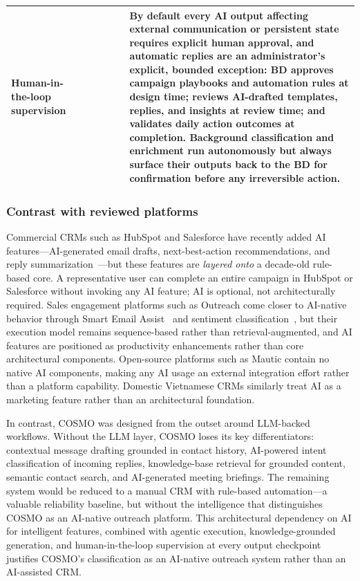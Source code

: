 \documentclass[a4paper]{article}
\newcommand{\fullcimark}{\CIRCLE}
\newcommand{\halfcimark}{\LEFTcircle}
\newcommand{\nocimark}{\Circle}
\begin{document}
\begin{table}[H]
{\begin{tabular}{l c c c c c p{6.5cm}}
\addlinespace
\addlinespace
Human-in-the-loop supervision
& \fullcimark & \halfcimark & \halfcimark & \fullcimark & \nocimark
& By default every AI output affecting external communication or
persistent state requires explicit human approval, and automatic
replies are an administrator's explicit, bounded exception: BD approves campaign
playbooks and automation rules at design time; reviews AI-drafted
templates, replies, and insights at review time; and validates
daily action outcomes at completion. Background classification
and enrichment run autonomously but always surface their outputs
back to the BD for confirmation before any irreversible action. \\

\bottomrule
\end{tabular}}
\end{table}

\subsubsection{Contrast with reviewed platforms} 
Commercial CRMs such as HubSpot and Salesforce have recently added 
AI features---AI-generated email drafts, next-best-action 
recommendations, and reply 
summarization~\cite{hubspot_ai_email_creation, 
salesforce_einstein_gpt_sales_emails, ms_d365_copilot_overview}---but 
these features are \emph{layered onto} a decade-old rule-based 
core. A representative user can complete an entire campaign in 
HubSpot or Salesforce without invoking any AI feature; AI is 
optional, not architecturally required. Sales engagement platforms 
such as Outreach come closer to AI-native behavior through Smart 
Email Assist~\cite{outreach_ai_content_reporting} and sentiment 
classification~\cite{outreach_sentiment_classification}, but their 
execution model remains sequence-based rather than 
retrieval-augmented, and AI features are positioned as productivity 
enhancements rather than core architectural components. Open-source 
platforms such as Mautic contain no native AI components, 
making any AI usage an external integration effort rather than a 
platform capability. Domestic Vietnamese CRMs similarly treat AI 
as a marketing feature rather than an architectural foundation.

In contrast, COSMO was designed from the outset around LLM-backed 
workflows. Without the LLM layer, COSMO loses its key 
differentiators: contextual message drafting grounded in contact 
history, AI-powered intent classification of incoming replies, 
knowledge-base retrieval for grounded content, semantic contact 
search, and AI-generated meeting briefings. The remaining system 
would be reduced to a manual CRM with rule-based automation---a 
valuable reliability baseline, but without the intelligence that 
distinguishes COSMO as an AI-native outreach platform. This architectural dependency on AI for intelligent features, combined with agentic execution, knowledge-grounded generation, and human-in-the-loop supervision at every output checkpoint justifies COSMO's classification as an AI-native outreach system rather than an 
AI-assisted CRM.
\end{document}
